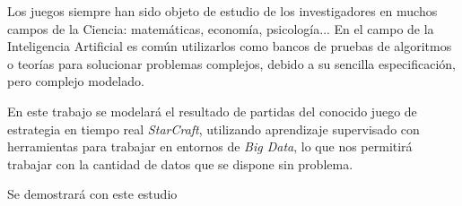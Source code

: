 Los juegos siempre han sido objeto de estudio de los investigadores en
muchos campos de la Ciencia: matemáticas, economía, psicología... En el campo
de la Inteligencia Artificial es común utilizarlos como bancos de pruebas
de algoritmos o teorías para solucionar problemas complejos, debido a su
sencilla especificación, pero complejo modelado.

En este trabajo se modelará el resultado de partidas del conocido juego de
estrategia en tiempo real \emph{StarCraft}, utilizando aprendizaje supervisado
con herramientas para trabajar en entornos de \emph{Big Data}, lo que nos
permitirá trabajar con la cantidad de datos que se dispone sin problema.

Se demostrará con este estudio 
